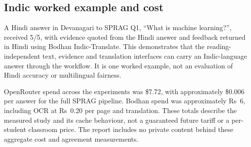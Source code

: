 \subsection{Indic worked example and cost}
A Hindi answer in Devanagari to SPRAG Q1, ``What is machine learning?'', received 5/5, with evidence quoted from the Hindi answer and feedback returned in Hindi using Bodhan Indic-Translate. This demonstrates that the reading-independent text, evidence and translation interfaces can carry an Indic-language answer through the workflow. It is one worked example, not an evaluation of Hindi accuracy or multilingual fairness.

OpenRouter spend across the experiments was \$7.72, with approximately \$0.006 per answer for the full SPRAG pipeline. Bodhan spend was approximately Rs~6, including OCR at Rs~0.20 per page and translation. These totals describe the measured study and its cache behaviour, not a guaranteed future tariff or a per-student classroom price. The report includes no private content behind these aggregate cost and agreement measurements.
